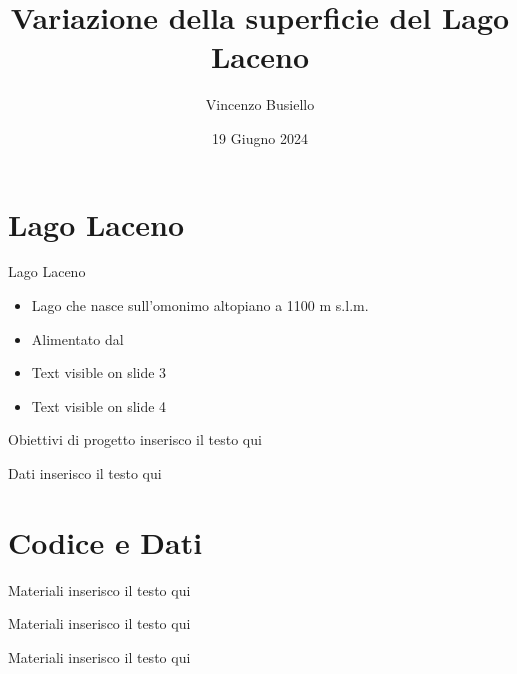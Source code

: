 \documentclass{beamer} %
\title{Variazione della superficie del Lago Laceno}
\author{Vincenzo Busiello}
\date{19 Giugno 2024}
\begin{document}
\maketitle


\section{Lago Laceno}

        \begin{frame}{Lago Laceno}
            \begin{itemize}
                \item Lago che nasce sull'omonimo altopiano a 1100 m s.l.m.
                \item Alimentato dal 
                \item Text visible on slide 3
                \item Text visible on slide 4
            \end{itemize}
        \end{frame}

        \begin{frame}{Obiettivi di progetto}
            inserisco il testo qui
        \end{frame}

        \begin{frame}{Dati}
            inserisco il testo qui
        \end{frame}

\section{Codice e Dati}

        \begin{frame}{Materiali}
            inserisco il testo qui
        \end{frame}
        
        \begin{frame}{Materiali}
            inserisco il testo qui
        \end{frame}
        
        \begin{frame}{Materiali}
            inserisco il testo qui
        \end{frame}
        
\end{document}
